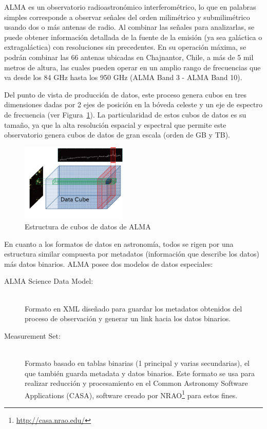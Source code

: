ALMA es un observatorio radioastronómico interferométrico, 
lo que en palabras simples corresponde a observar señales del orden 
milimétrico y submilimétrico usando dos o más antenas de radio. Al combinar las señales 
para analizarlas, se puede obtener información detallada de la fuente de la emisión 
(ya sea galáctica o extragaláctica) con resoluciones sin precedentes.
En su operación máxima, se podrán combinar las 66 antenas ubicadas en Chajnantor,
Chile, a más de 5 mil metros de altura, las cuales pueden operar en un amplio rango 
de frecuencias que va desde los 84 GHz hasta los 950 GHz (ALMA Band 3 - ALMA Band 10). 

Del punto de vista de producción de datos, este proceso genera cubos en tres
dimensiones dadas por 2 ejes de posición en la bóveda celeste y un eje de
espectro de frecuencia (ver Figura~\ref{fig:cube}). La particularidad de estos 
cubos de datos es su tamaño, ya que la alta resolución espacial y espectral que
permite este observatorio genera cubos de datos de gran escala (orden de GB y TB).

\begin{figure}[ht]
    \centering
    \includegraphics[width=0.45\textwidth]{images/cube.png}
    \caption{Estructura de cubos de datos de ALMA \cite{dent20132}}
    \label{fig:cube}
\end{figure}

En cuanto a los formatos de datos en astronomía, todos se rigen por una estructura
similar compuesta por metadatos (información que describe los datos) más datos
binarios. ALMA posee dos modelos de datos especiales:
\begin{description}
    \item[ALMA Science Data Model:] \hfill \\
        Formato en XML diseñado para guardar los metadatos obtenidos del
        proceso de observación y generar un link hacia los datos binarios.
    \item[Measurement Set:] \hfill \\
        Formato basado en tablas binarias (1 principal y varias secundarias),
        el que también guarda metadata y datos binarios. Este formato se usa
        para realizar reducción y procesamiento en el 
        Common Astronomy Software Applications (CASA), 
        software creado por NRAO\footnote{\url{http://casa.nrao.edu/}} para estos fines.
\end{description}

